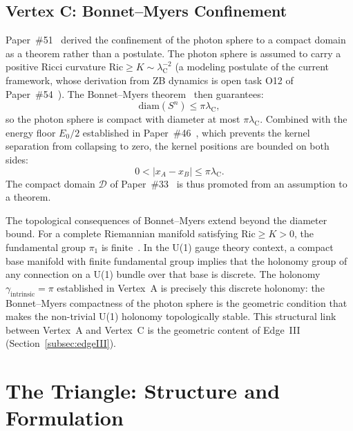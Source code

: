 \documentclass[%
 reprint, amsmath,amssymb, aps, prd, ]{revtex4-2}
\numberwithin{equation}{section}
\newcommand{\lambdaC}{\lambda_{\mathrm{C}}}
\begin{document}
\subsection{Vertex C: Bonnet--Myers Confinement}
\label{subsec:vertexC}

Paper~\#51~\cite{hanamura51} derived the confinement of the photon sphere to a compact domain as a theorem rather than a postulate.
The photon sphere is assumed to carry a positive Ricci curvature $\mathrm{Ric} \geq K \sim \lambdaC^{-2}$ (a modeling postulate of the current framework, whose derivation from ZB dynamics is open task O12 of Paper~\#54~\cite{hanamura54}).
The Bonnet--Myers theorem~\cite{Myers1941,Chavel2006} then guarantees:
\begin{equation}
\mathrm{diam}(S^n) \leq \pi \lambdaC,
\label{eq:bonnet_myers}
\end{equation}
so the photon sphere is compact with diameter at most $\pi\lambdaC$.
Combined with the energy floor $E_0/2$ established in Paper~\#46~\cite{hanamura46}, which prevents the kernel separation from collapsing to zero, the kernel positions are bounded on both sides:
\begin{equation}
0 < |x_A - x_B| \leq \pi\lambdaC.
\label{eq:double_bound}
\end{equation}
The compact domain $\mathcal{D}$ of Paper~\#33~\cite{hanamura33} is thus promoted from an assumption to a theorem.

The topological consequences of Bonnet--Myers extend beyond the diameter bound.
For a complete Riemannian manifold satisfying $\mathrm{Ric} \geq K > 0$, the fundamental group $\pi_1$ is finite~\cite{Myers1941}.
In the U(1) gauge theory context, a compact base manifold with finite fundamental group implies that the holonomy group of any connection on a U(1) bundle over that base is discrete.
The holonomy $\gamma_\mathrm{intrinsic} = \pi$ established in Vertex~A is precisely this discrete holonomy: the Bonnet--Myers compactness of the photon sphere is the geometric condition that makes the non-trivial U(1) holonomy topologically stable.
This structural link between Vertex~A and Vertex~C is the geometric content of Edge~III (Section~\ref{subsec:edgeIII}).

\section{The Triangle: Structure and Formulation}
\label{sec:triangle}
\end{document}
